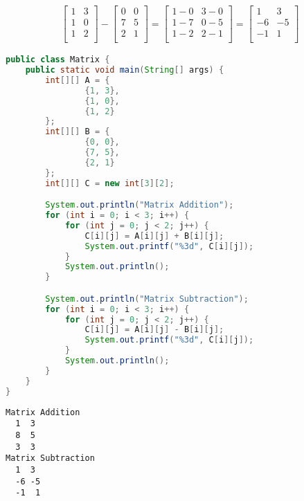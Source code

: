 \begin{align}\nonumber
	\left[\begin{matrix}
			1 & 3 \\
			1 & 0 \\
			1 & 2 \\
		\end{matrix} \right]
	-
	\left[\begin{matrix}
			0 & 0 \\
			7 & 5 \\
			2 & 1 \\
		\end{matrix} \right]
	=
	\left[\begin{matrix}
			1-0 & 3-0 \\
			1-7 & 0-5 \\
			1-2 & 2-1 \\
		\end{matrix} \right]
	=
	\left[\begin{matrix}
			1  & 3  \\
			-6 & -5 \\
			-1 & 1  \\
		\end{matrix} \right]
\end{align}

\begin{lstlisting}[language=Java]
public class Matrix {
	public static void main(String[] args) {
		int[][] A = {
				{1, 3},
				{1, 0},
				{1, 2}
		};
		int[][] B = {
				{0, 0},
				{7, 5},
				{2, 1}
		};
		int[][] C = new int[3][2];

		System.out.println("Matrix Addition");
		for (int i = 0; i < 3; i++) {
			for (int j = 0; j < 2; j++) {
				C[i][j] = A[i][j] + B[i][j];
				System.out.printf("%3d", C[i][j]);
			}
			System.out.println();
		}

		System.out.println("Matrix Subtraction");
		for (int i = 0; i < 3; i++) {
			for (int j = 0; j < 2; j++) {
				C[i][j] = A[i][j] - B[i][j];
				System.out.printf("%3d", C[i][j]);
			}
			System.out.println();
		}
	}
}
\end{lstlisting}

\begin{tcolorbox}
	\begin{verbatim}
Matrix Addition
  1  3
  8  5
  3  3
Matrix Subtraction
  1  3
  -6 -5
  -1  1 
	\end{verbatim}
\end{tcolorbox}

\newpage

